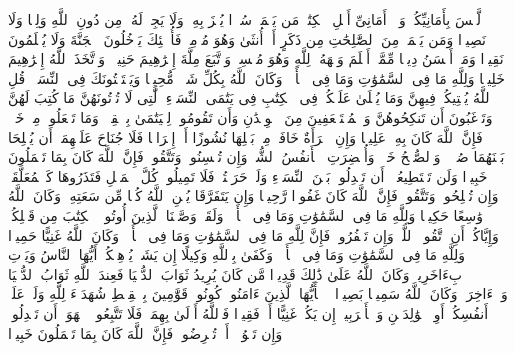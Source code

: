 \stopbuffer
\startbuffer[\q:4:123]
لَّیۡسَ بِأَمَانِیِّكُمۡ وَلَاۤ أَمَانِیِّ أَهۡلِ ٱلۡكِتَٰبِۗ مَن یَعۡمَلۡ سُوۤءࣰا یُجۡزَ بِهِۦ وَلَا یَجِدۡ لَهُۥ مِن دُونِ ٱللَّهِ وَلِیࣰّا وَلَا نَصِیرࣰا%
\stopbuffer
\startbuffer[\q:4:124]
وَمَن یَعۡمَلۡ مِنَ ٱلصَّٰلِحَٰتِ مِن ذَكَرٍ أَوۡ أُنثَىٰ وَهُوَ مُؤۡمِنࣱ فَأُو۟لَٰۤئِكَ یَدۡخُلُونَ ٱلۡجَنَّةَ وَلَا یُظۡلَمُونَ نَقِیرࣰا%
\stopbuffer
\startbuffer[\q:4:125]
وَمَنۡ أَحۡسَنُ دِینࣰا مِّمَّنۡ أَسۡلَمَ وَجۡهَهُۥ لِلَّهِ وَهُوَ مُحۡسِنࣱ وَٱتَّبَعَ مِلَّةَ إِبۡرَٰهِیمَ حَنِیفࣰاۗ وَٱتَّخَذَ ٱللَّهُ إِبۡرَٰهِیمَ خَلِیلࣰا%
\stopbuffer
\startbuffer[\q:4:126]
وَلِلَّهِ مَا فِی ٱلسَّمَٰوَٰتِ وَمَا فِی ٱلۡأَرۡضِۚ وَكَانَ ٱللَّهُ بِكُلِّ شَیۡءࣲ مُّحِیطࣰا%
\stopbuffer
\startbuffer[\q:4:127]
وَیَسۡتَفۡتُونَكَ فِی ٱلنِّسَاۤءِۖ قُلِ ٱللَّهُ یُفۡتِیكُمۡ فِیهِنَّ وَمَا یُتۡلَىٰ عَلَیۡكُمۡ فِی ٱلۡكِتَٰبِ فِی یَتَٰمَى ٱلنِّسَاۤءِ ٱلَّٰتِی لَا تُؤۡتُونَهُنَّ مَا كُتِبَ لَهُنَّ وَتَرۡغَبُونَ أَن تَنكِحُوهُنَّ وَٱلۡمُسۡتَضۡعَفِینَ مِنَ ٱلۡوِلۡدَٰنِ وَأَن تَقُومُوا۟ لِلۡیَتَٰمَىٰ بِٱلۡقِسۡطِۚ وَمَا تَفۡعَلُوا۟ مِنۡ خَیۡرࣲ فَإِنَّ ٱللَّهَ كَانَ بِهِۦ عَلِیمࣰا%
\stopbuffer
\startbuffer[\q:4:128]
وَإِنِ ٱمۡرَأَةٌ خَافَتۡ مِنۢ بَعۡلِهَا نُشُوزًا أَوۡ إِعۡرَاضࣰا فَلَا جُنَاحَ عَلَیۡهِمَاۤ أَن یُصۡلِحَا بَیۡنَهُمَا صُلۡحࣰاۚ وَٱلصُّلۡحُ خَیۡرࣱۗ وَأُحۡضِرَتِ ٱلۡأَنفُسُ ٱلشُّحَّۚ وَإِن تُحۡسِنُوا۟ وَتَتَّقُوا۟ فَإِنَّ ٱللَّهَ كَانَ بِمَا تَعۡمَلُونَ خَبِیرࣰا%
\stopbuffer
\startbuffer[\q:4:129]
وَلَن تَسۡتَطِیعُوۤا۟ أَن تَعۡدِلُوا۟ بَیۡنَ ٱلنِّسَاۤءِ وَلَوۡ حَرَصۡتُمۡۖ فَلَا تَمِیلُوا۟ كُلَّ ٱلۡمَیۡلِ فَتَذَرُوهَا كَٱلۡمُعَلَّقَةِۚ وَإِن تُصۡلِحُوا۟ وَتَتَّقُوا۟ فَإِنَّ ٱللَّهَ كَانَ غَفُورࣰا رَّحِیمࣰا%
\stopbuffer
\startbuffer[\q:4:130]
وَإِن یَتَفَرَّقَا یُغۡنِ ٱللَّهُ كُلࣰّا مِّن سَعَتِهِۦۚ وَكَانَ ٱللَّهُ وَٰسِعًا حَكِیمࣰا%
\stopbuffer
\startbuffer[\q:4:131]
وَلِلَّهِ مَا فِی ٱلسَّمَٰوَٰتِ وَمَا فِی ٱلۡأَرۡضِۗ وَلَقَدۡ وَصَّیۡنَا ٱلَّذِینَ أُوتُوا۟ ٱلۡكِتَٰبَ مِن قَبۡلِكُمۡ وَإِیَّاكُمۡ أَنِ ٱتَّقُوا۟ ٱللَّهَۚ وَإِن تَكۡفُرُوا۟ فَإِنَّ لِلَّهِ مَا فِی ٱلسَّمَٰوَٰتِ وَمَا فِی ٱلۡأَرۡضِۚ وَكَانَ ٱللَّهُ غَنِیًّا حَمِیدࣰا%
\stopbuffer
\startbuffer[\q:4:132]
وَلِلَّهِ مَا فِی ٱلسَّمَٰوَٰتِ وَمَا فِی ٱلۡأَرۡضِۚ وَكَفَىٰ بِٱللَّهِ وَكِیلًا%
\stopbuffer
\startbuffer[\q:4:133]
إِن یَشَأۡ یُذۡهِبۡكُمۡ أَیُّهَا ٱلنَّاسُ وَیَأۡتِ بِءَاخَرِینَۚ وَكَانَ ٱللَّهُ عَلَىٰ ذَٰلِكَ قَدِیرࣰا%
\stopbuffer
\startbuffer[\q:4:134]
مَّن كَانَ یُرِیدُ ثَوَابَ ٱلدُّنۡیَا فَعِندَ ٱللَّهِ ثَوَابُ ٱلدُّنۡیَا وَٱلۡءَاخِرَةِۚ وَكَانَ ٱللَّهُ سَمِیعَۢا بَصِیرࣰا%
\stopbuffer
\startbuffer[\q:4:135]
۞ یَٰۤأَیُّهَا ٱلَّذِینَ ءَامَنُوا۟ كُونُوا۟ قَوَّٰمِینَ بِٱلۡقِسۡطِ شُهَدَاۤءَ لِلَّهِ وَلَوۡ عَلَىٰۤ أَنفُسِكُمۡ أَوِ ٱلۡوَٰلِدَیۡنِ وَٱلۡأَقۡرَبِینَۚ إِن یَكُنۡ غَنِیًّا أَوۡ فَقِیرࣰا فَٱللَّهُ أَوۡلَىٰ بِهِمَاۖ فَلَا تَتَّبِعُوا۟ ٱلۡهَوَىٰۤ أَن تَعۡدِلُوا۟ۚ وَإِن تَلۡوُۥۤا۟ أَوۡ تُعۡرِضُوا۟ فَإِنَّ ٱللَّهَ كَانَ بِمَا تَعۡمَلُونَ خَبِیرࣰا%
